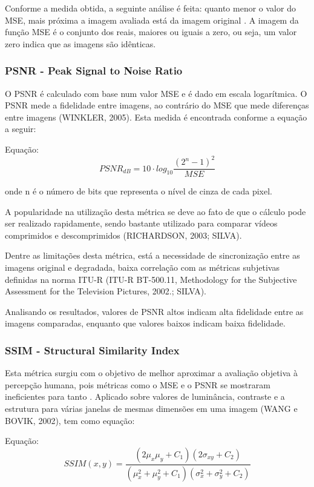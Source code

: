     Conforme a medida obtida, a seguinte análise é feita: quanto menor o valor do MSE, mais próxima a imagem avaliada está da imagem original \cite{albini}. A imagem da função MSE é o conjunto dos reais, maiores ou iguais a zero, ou seja, um valor zero indica que as imagens são idênticas.

\subsubsection{PSNR - Peak Signal to Noise Ratio}
O PSNR é calculado com base num valor MSE e é dado em escala logarítmica. O PSNR mede a fidelidade entre imagens, ao contrário do MSE que mede diferenças entre imagens (WINKLER, 2005). Esta medida é encontrada conforme a equação a seguir:

Equação: \[PSNR_{dB} = 10 \cdot log_{10} \frac{{\left(2^{n} -1 \right )}^{2}}{MSE}\]

onde n é o número de bits que representa o nível de cinza de cada pixel.

A popularidade na utilização desta métrica se deve ao fato de que o cálculo pode ser realizado rapidamente, sendo bastante utilizado para comparar vídeos comprimidos e descomprimidos (RICHARDSON, 2003; SILVA).

Dentre as limitações desta métrica, está a necessidade de sincronização entre as imagens original e degradada, baixa correlação com as métricas subjetivas definidas na norma ITU-R (ITU-R BT-500.11, Methodology for the Subjective Assessment for the Television Pictures, 2002.; SILVA).

Analisando os resultados, valores de PSNR altos indicam alta fidelidade entre as imagens comparadas, enquanto que valores baixos indicam baixa fidelidade.

\subsubsection{SSIM - Structural Similarity Index}

Esta métrica surgiu com o objetivo de melhor aproximar a avaliação objetiva à percepção humana, pois métricas como o MSE e o PSNR se mostraram ineficientes para tanto \cite{emmersonsilva}. Aplicado sobre valores de luminância, contraste e a estrutura para várias janelas de mesmas dimensões em uma imagem (WANG e BOVIK, 2002), tem como equação:

    Equação: \[SSIM(x, y) = \frac{(2\mu_{x}\mu_{y} + C_{1})(2\sigma_{xy} + C_{2})} {(\mu_{x}^{2} + \mu_{y}^{2}+C_{1})(\sigma_{x}^{2} + \sigma_{y}^{2}+C_{2})}\]

